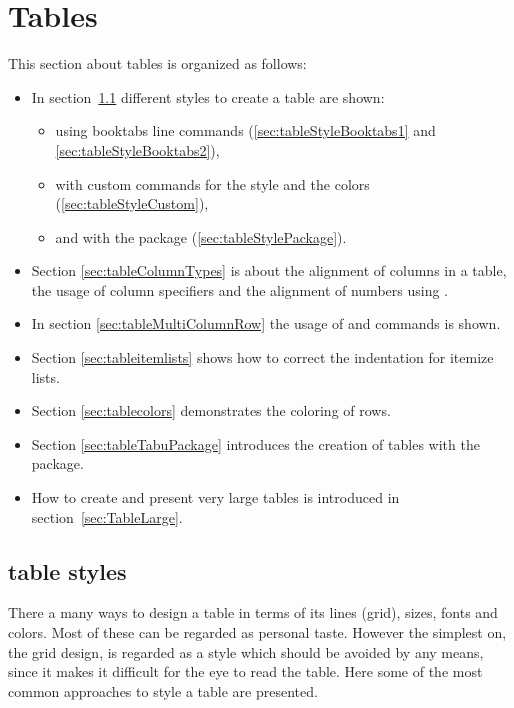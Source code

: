 \section{Tables}
\label{sec:demo:tables}
%
This section about tables is organized as follows:
\begin{itemize}
\item In section~\ref{sec:tableStylesIntro} different styles to create a table are shown: 
  \begin{itemize}
  \item using booktabs line commands (\ref{sec:tableStyleBooktabs1} and
        \ref{sec:tableStyleBooktabs2}),
  \item with custom commands for the style and the colors
        (\ref{sec:tableStyleCustom}), 
  \item and with the package 
        (\ref{sec:tableStylePackage}).
  \end{itemize}
%
\item Section \ref{sec:tableColumnTypes} is about
      the alignment of columns in a table, the usage of column specifiers and the alignment of numbers using .
%
\item In section \ref{sec:tableMultiColumnRow} the usage of 
       and  commands is shown.
%
\item Section \ref{sec:tableitemlists} shows how to correct the indentation
      for itemize lists.
%
\item Section \ref{sec:tablecolors} demonstrates the coloring of rows.
%
\item Section \ref{sec:tableTabuPackage} 
      introduces the creation of tables with the  package.
%
\item How to create and present very large tables is introduced in section~\ref{sec:TableLarge}.
\end{itemize}

\subsection{table styles}
\label{sec:tableStylesIntro}

There a many ways to design a table in terms of its lines (grid), sizes, fonts and colors. Most of these can be regarded as personal taste. However the simplest on, the grid design, is regarded as a style which should be avoided by any means, since it makes it difficult for the eye to read the table.
Here some of the most common approaches to style a table are presented.

